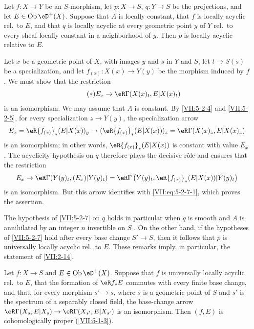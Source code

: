 \begin{corollary}\label{VII:5-2-7}
Let $f:X\to Y$ be an $S$-morphism, let $p:X\to S$, $q:Y\to S$ be the
projections, and let $E\in\ob\eD^+(X)$. Suppose that $A$ is locally constant,
that $f$ is locally acyclic rel.\ to $E$, and that $q$ is locally acyclic at
every geometric point $y$ of $Y$ rel.\ to every sheaf locally constant
in a neighborhood of $y$. Then $p$ is locally acyclic relative to $E$.
\end{corollary}

Let $x$ be a geometric point of $X$, with images $y$ and $s$ in $Y$ and $S$,
let $t\to S(s)$ be a specialization, and let
$f_{(x)}:X(x)\to Y(y)$ be the morphism induced by $f$. We must show that the
restriction
\begin{equation*}\tag{$*$}\label{VII:eq:5-2-7-1}
  E_x \to \eR\Gamma(X(x)_t,E|X(x)_t) 
\end{equation*}
is an isomorphism. We may assume that $A$ is constant. By \ref{VII:5-2-4} and
\ref{VII:5-2-5}, for every specialization $z\to Y(y)$, the specialization
arrow
\[
  E_x = \eR {f_{(x)}}_\ast (E|X(x))_y \to (\eR {f_{(x)}}_\ast (E|X(x)))_z = \eR\Gamma(X(x)_z,E|X(x)_z) 
\]
is an isomorphism; in other words, $\eR{f_{(x)}}_\ast(E|X(x))$ is constant
with value $E_x$. The acyclicity hypothesis on $q$ therefore plays the
decisive r\^ole and ensures that the restriction
\[
  E_x \to \eR\Gamma(Y(y)_t,(E_x)|Y(y)_t) = \eR\Gamma\left(Y(y)_t,\eR {f_{(x)}}_\ast (E|X(x))|Y(y)_t\right)
\]
is an isomorphism. But this arrow identifies with
\eqref{VII:eq:5-2-7-1}, which proves the assertion.

The hypothesis of \ref{VII:5-2-7} on $q$ holds in particular when $q$ is
smooth and $A$ is annihilated by an integer $n$ invertible on $S$
\cite[XV]{sga4}. On the other hand, if the hypotheses of \ref{VII:5-2-7} hold
after every base change $S'\to S$, then it follows that $p$ is universally
locally acyclic rel.\ to $E$. These remarks imply, in particular, the
statement of \ref{VII:2-14}.






\begin{corollary}\label{VII:5-2-8}
Let $f:X\to S$ and $E\in \ob\eD^+(X)$. Suppose that $f$ is universally locally
acyclic rel.\ to $E$, that the formation of $\eR f_\ast E$ commutes with
every finite base change, and that, for every morphism $s'\to s$, where $s$ is
a geometric point of $S$ and $s'$ is the spectrum of a separably closed
field, the base-change arrow
$\eR\Gamma(X_s,E|X_s)\to \eR\Gamma(X_{s'},E|X_{s'})$ is an isomorphism. Then
$(f,E)$ is cohomologically proper (\ref{VII:5-1-3}).
\end{corollary}

